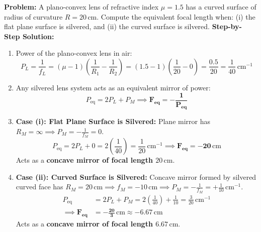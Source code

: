\documentclass[10pt,twoside,openright]{book}
\begin{document}
\begin{usecasebox}
\textbf{Problem:} A plano-convex lens of refractive index $\mu = 1.5$ has a curved surface of radius of curvature $R = 20\,\mathrm{cm}$. Compute the equivalent focal length when: (i) the flat plane surface is silvered, and (ii) the curved surface is silvered.
\textbf{Step-by-Step Solution:}
\begin{enumerate}
  \item Power of the plano-convex lens in air:
  \begin{equation}
    P_L = \frac{1}{f_L} = (\mu - 1)\left(\frac{1}{R_1} - \frac{1}{R_2}\right) = (1.5 - 1)\left(\frac{1}{20} - 0\right) = \frac{0.5}{20} = \frac{1}{40}\,\mathrm{cm}^{-1}
  \end{equation}
  \item Any silvered lens system acts as an equivalent mirror of power:
  \begin{equation}
    P_{\text{eq}} = 2 P_L + P_M \implies \mathbf{F_{\text{eq}} = -\frac{1}{P_{\text{eq}}}}
  \end{equation}
  \item \textbf{Case (i): Flat Plane Surface is Silvered:}
  Plane mirror has $R_M = \infty \implies P_M = -\frac{1}{f_M} = 0$.
  \begin{equation}
    P_{\text{eq}} = 2 P_L + 0 = 2 \left(\frac{1}{40}\right) = \frac{1}{20}\,\mathrm{cm}^{-1} \implies \mathbf{F_{\text{eq}} = -20\,\mathrm{cm}}
  \end{equation}
  Acts as a \textbf{concave mirror of focal length $20\,\mathrm{cm}$}.
  \item \textbf{Case (ii): Curved Surface is Silvered:}
  Concave mirror formed by silvered curved face has $R_M = 20\,\mathrm{cm} \implies f_M = -10\,\mathrm{cm} \implies P_M = -\frac{1}{f_M} = +\frac{1}{10}\,\mathrm{cm}^{-1}$.
  \begin{align}
    P_{\text{eq}} &= 2 P_L + P_M = 2 \left(\frac{1}{40}\right) + \frac{1}{10} = \frac{3}{20}\,\mathrm{cm}^{-1} \\
    \implies \mathbf{F_{\text{eq}}} &= \mathbf{-\frac{20}{3}\,\mathrm{cm} \approx -6.67\,\mathrm{cm}}
  \end{align}
  Acts as a \textbf{concave mirror of focal length $6.67\,\mathrm{cm}$}.
\end{enumerate}
\end{usecasebox}
\end{document}
